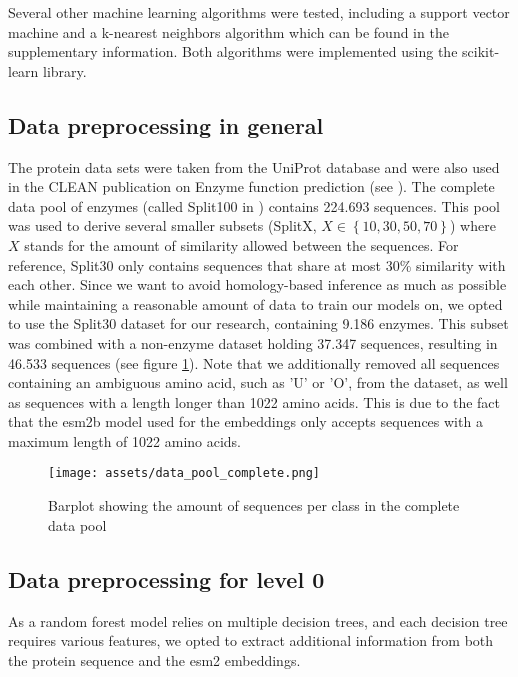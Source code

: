\documentclass{bioinfo}
\begin{document}
\begin{methods}
Several other machine learning algorithms were tested, including a support vector machine and a k-nearest neighbors algorithm
which can be found in the supplementary information. Both algorithms were implemented using the scikit-learn library.

\subsection{Data preprocessing in general}

The protein data sets were taken from the UniProt database and were also used in the CLEAN publication on Enzyme function prediction (see \cite{CleanArticle}). 
The complete data pool of enzymes (called Split100 in \cite{CLEANgit}) contains 224.693 sequences. 
This pool was used to derive several smaller subsets (SplitX, $X \in \left\{10, 30, 50, 70\right\}$) where $X$ stands for the amount of similarity allowed between the sequences.
For reference, Split30 only contains sequences that share at most 30\% similarity with each other.
Since we want to avoid homology-based inference as much as possible while 
maintaining a reasonable amount of data to train our models on, we opted to use the Split30 dataset for our research,
containing 9.186 enzymes. This subset was combined with a non-enzyme dataset holding 37.347 sequences, resulting in 46.533 sequences (see figure \ref{fig:DataPoolDist}).
Note that we additionally removed all sequences containing an ambiguous amino acid, such as 'U' or 'O', from the dataset, as well as
sequences with a length longer than 1022 amino acids. 
This is due to the fact that the esm2b model used for the embeddings only accepts sequences 
with a maximum length of 1022 amino acids. %

\begin{figure}[!htbp]
\texttt{[image: assets/data\_pool\_complete.png]}
\caption{Barplot showing the amount of sequences per class in the complete data pool}\label{fig:DataPoolDist}
\end{figure}

\subsection{Data preprocessing for level 0}
As a random forest model relies on multiple decision trees, and each decision tree requires various features,
we opted to extract additional information from both the protein sequence and the esm2 embeddings. %


\end{methods}
\end{document}
